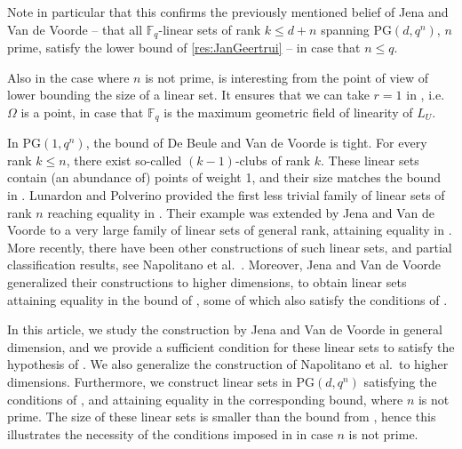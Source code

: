 \documentclass[11pt]{article}
\theoremstyle{definition}
\newcommand{\fq}{{\mathbb F}_{q}}
\newcommand{\PG}{\mathrm{PG}}
\newcommand{\pg}{\PG}
\begin{document}
Note in particular that this confirms the previously mentioned belief of Jena and Van de Voorde \cite[\S 2.5 (B)]{Jena2021onlinearsets} -- that all $\fq$-linear sets of rank $k \leq d+n$ spanning $\pg(d,q^n)$, $n$ prime, satisfy the lower bound of \ref{res:JanGeertrui} -- in case that $n \leq q$.

Also in the case where $n$ is not prime,  is interesting from the point of view of lower bounding the size of a linear set.
It ensures that we can take $r=1$ in , i.e.\ $\Omega$ is a point, in case that $\fq$ is the maximum geometric field of linearity of $L_U$.

In $\PG(1,q^n)$, the bound of De Beule and Van de Voorde is tight.
For every rank $k \leq n$, there exist so-called $(k-1)$-clubs of rank $k$.
These linear sets contain (an abundance of) points of weight 1, and their size matches the bound in .
Lunardon and Polverino \cite{lunardon2000blocking} provided the first less trivial family of linear sets of rank $n$ reaching equality in .
Their example was extended by Jena and Van de Voorde \cite{Jena2021onlinearsets} to a very large family of linear sets of general rank, attaining equality in .
More recently, there have been other constructions of such linear sets, and partial classification results, see Napolitano et al.\ \cite{napolitano2022classification}.
Moreover, Jena and Van de Voorde generalized their constructions to higher dimensions, to obtain linear sets attaining equality in the bound of , some of which also satisfy the conditions of  \cite[\S 2.5 (B)]{Jena2021onlinearsets}.

In this article, we study the construction by Jena and Van de Voorde in general dimension, and we provide a sufficient condition for these linear sets to satisfy the hypothesis of .
We also generalize the construction of Napolitano et al.\ to higher dimensions.
Furthermore, we construct linear sets in $\PG(d,q^n)$ satisfying the conditions of , and attaining equality in the corresponding bound, where $n$ is not prime.
The size of these linear sets is smaller than the bound from , hence this illustrates the necessity of the conditions imposed in  in case $n$ is not prime.

\bigskip
\end{document}
